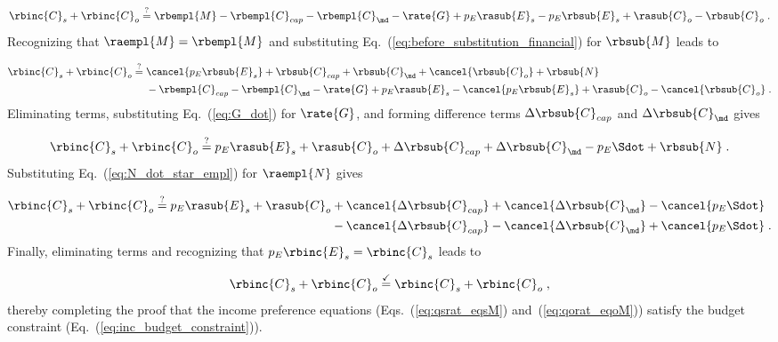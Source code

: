 \begin{equation}
  \rbinc{C}_s + \rbinc{C}_o \stackrel{?}{=} \rbempl{M} - \rbempl{C}_{cap} - \rbempl{C}_{\md} - \rate{G} 
            + p_E \rasub{E}_s - p_E \rbsub{E}_s + \rasub{C}_o - \rbsub{C}_o \; .
\end{equation}
%
Recognizing that $\raempl{M} = \rbempl{M}$ and 
substituting Eq.~(\ref{eq:before_substitution_financial}) for $\rbsub{M}$
leads to 

\begin{align}
  \rbinc{C}_s + \rbinc{C}_o \stackrel{?}{=} \; & \cancel{p_E \rbsub{E}_s} + \rbsub{C}_{cap} + \rbsub{C}_{\md}
                                              + \cancel{\rbsub{C}_o} + \rbsub{N} \nonumber \\
                                            & - \rbempl{C}_{cap} - \rbempl{C}_{\md} - \rate{G}
                                              + p_E \rasub{E}_s - \cancel{p_E \rbsub{E}_s}
                                              + \rasub{C}_o - \cancel{\rbsub{C}_o} \; .
\end{align}
%
Eliminating terms, substituting Eq.~(\ref{eq:G_dot}) for $\rate{G}$, and 
forming difference terms $\Delta \rbsub{C}_{cap}$ and $\Delta \rbsub{C}_{\md}$ gives

\begin{equation}
  \rbinc{C}_s + \rbinc{C}_o \stackrel{?}{=} p_E \rasub{E}_s + \rasub{C}_o
                                            + \Delta \rbsub{C}_{cap} + \Delta \rbsub{C}_{\md}
                                            - p_E \Sdot + \rbsub{N} \; .
\end{equation}
%
Substituting Eq.~(\ref{eq:N_dot_star_empl}) for $\raempl{N}$ gives 

\begin{align}
  \rbinc{C}_s + \rbinc{C}_o \stackrel{?}{=} p_E \rasub{E}_s + \rasub{C}_o
        & + \cancel{\Delta \rbsub{C}_{cap}} + \cancel{\Delta \rbsub{C}_{\md}} - \cancel{p_E \Sdot} \nonumber \\
        & - \cancel{\Delta \rbsub{C}_{cap}} - \cancel{\Delta \rbsub{C}_{\md}} + \cancel{p_E \Sdot} \; .
\end{align}
%
Finally, eliminating terms and recognizing that $p_E \rbinc{E}_s = \rbinc{C}_s$ leads to

\begin{equation}
  \rbinc{C}_s + \rbinc{C}_o \stackrel{\checkmark}{=} \rbinc{C}_s + \rbinc{C}_o \; ,
\end{equation}
%
thereby completing the proof that the income preference equations
(Eqs.~(\ref{eq:qsrat_eqsM}) and~(\ref{eq:qorat_eqoM}))
satisfy the budget constraint
(Eq.~(\ref{eq:inc_budget_constraint})).
